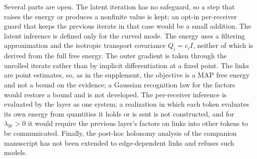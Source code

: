 \documentclass[11pt]{article}
\theoremstyle{definition}
\theoremstyle{remark}
\begin{document}
Several parts are open. The latent iteration has no safeguard, so a step that raises the energy or produces a nonfinite value is kept; an opt-in per-receiver guard that keeps the previous iterate in that case would be a small addition. The latent inference is defined only for the curved mode. The energy uses a filtering approximation and the isotropic transport covariance $Q_i=c_iI$, neither of which is derived from the full free energy. The outer gradient is taken through the unrolled iterate rather than by implicit differentiation at a fixed point. The links are point estimates, so, as in the supplement, the objective is a MAP free energy and not a bound on the evidence; a Gaussian recognition law for the factors would restore a bound and is not developed. The per-receiver inference is evaluated by the layer as one system; a realization in which each token evaluates its own energy from quantities it holds or is sent is not constructed, and for $\lambda_W>0$ it would require the previous layer's factors on links into other tokens to be communicated. Finally, the post-hoc holonomy analysis of the companion manuscript has not been extended to edge-dependent links and refuses such models.



\end{document}
